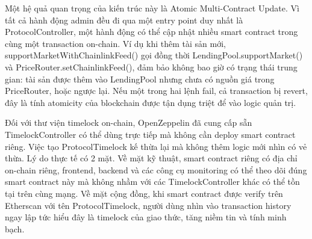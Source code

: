 \documentclass[../DoAn.tex]{subfiles}
\begin{document}
Một hệ quả quan trọng của kiến trúc này là Atomic Multi-Contract Update. Vì tất cả hành động admin đều đi qua một entry point duy nhất là ProtocolController, một hành động có thể cập nhật nhiều smart contract trong cùng một transaction on-chain. Ví dụ khi thêm tài sản mới, supportMarketWithChainlinkFeed() gọi đồng thời LendingPool.supportMarket() và PriceRouter.setChainlinkFeed(), đảm bảo không bao giờ có trạng thái trung gian: tài sản được thêm vào LendingPool nhưng chưa có nguồn giá trong PriceRouter, hoặc ngược lại. Nếu một trong hai lệnh fail, cả transaction bị revert, đây là tính atomicity của blockchain được tận dụng triệt để vào logic quản trị.

Đối với thư viện timelock on-chain, OpenZeppelin đã cung cấp sẵn TimelockController có thể dùng trực tiếp mà không cần deploy smart contract riêng. Việc tạo ProtocolTimelock kế thừa lại mà không thêm logic mới nhìn có vẻ thừa. Lý do thực tế có 2 mặt. Về mặt kỹ thuật, smart contract riêng có địa chỉ on-chain riêng, frontend, backend và các công cụ monitoring có thể theo dõi đúng smart contract này mà không nhầm với các TimelockController khác có thể tồn tại trên cùng mạng. Về mặt cộng đồng, khi smart contract được verify trên Etherscan với tên ProtocolTimelock, người dùng nhìn vào transaction history ngay lập tức hiểu đây là timelock của giao thức, tăng niềm tin và tính minh bạch.
\end{document}
